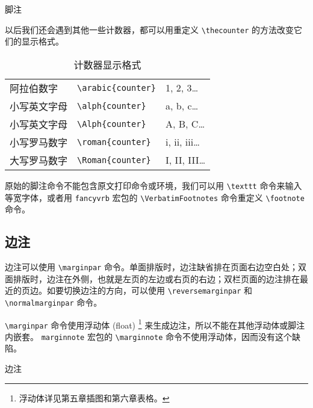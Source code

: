\begin{example}[h]
\begin{Code}[numbers=left]
\renewcommand{\thefootnote}{\roman{footnote}} %
\end{Code}
\caption{脚注}
\label{exa:footnote}
\end{example}

以后我们还会遇到其他一些计数器，都可以用重定义 \verb|\thecounter| 的方法改变它们的显示格式。

\begin{table}
\centering
\caption{计数器显示格式}
\label{tab:counter_format}
\begin{tabular}{lll}
  \toprule
  阿拉伯数字 & \verb|\arabic{counter}| & 1, 2, 3\dots \\
  小写英文字母 & \verb|\alph{counter}| & a, b, c\dots \\
  小写英文字母 & \verb|\Alph{counter}| & A, B, C\dots \\
  小写罗马数字 & \verb|\roman{counter}| & i, ii, iii\dots \\
  大写罗马数字 & \verb|\Roman{counter}| & I, II, III\dots \\
  \bottomrule
\end{tabular}
\end{table}

原始的脚注命令不能包含原文打印命令或环境，我们可以用 \verb|\texttt| 命令来输入等宽字体，或者用 \texttt{fancyvrb} 宏包的 \verb|\VerbatimFootnotes| 命令重定义 \verb|\footnote| 命令。

\subsection{边注}

边注可以使用 \verb|\marginpar| 命令。单面排版时，边注缺省排在页面右边空白处；双面排版时，边注在外侧，也就是左页的左边或右页的右边；双栏页面的边注排在最近的页边。如要切换边注的方向，可以使用 \verb|\reversemarginpar| 和 \verb|\normalmarginpar| 命令。

\verb|\marginpar| 命令使用浮动体 (float) \footnote{浮动体详见第五章插图和第六章表格。} 来生成边注，所以不能在其他浮动体或脚注内嵌套。 \texttt{marginnote} 宏包的 \verb|\marginnote| 命令不使用浮动体，因而没有这个缺陷。

\begin{example}[h]
\reversemarginpar
{}
\normalmarginpar

\begin{Code}[]
\reversemarginpar
{}
\normalmarginpar
\end{Code}
\caption{边注}
\end{example}

